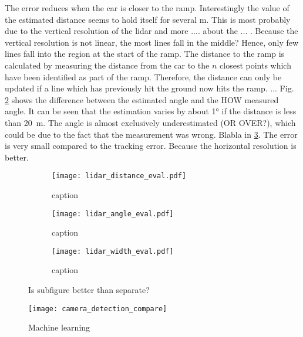 The error reduces when the car is closer to the ramp.
Interestingly the value of the estimated distance seems to hold itself for several m.
This is most probably due to the vertical resolution of the \gls{lidar} and more .... about the ... .
Because the vertical resolution is not linear, the most lines fall in the middle?
Hence, only few lines fall into the region at the start of the ramp.
The distance to the ramp is calculated by measuring the distance from the car to the $n$ closest points which have been identified as part of the ramp.
Therefore, the distance can only be updated if a line which has previously hit the ground now hits the ramp.
...
Fig. \ref{fig:lidar_angle_eval} shows the difference between the estimated angle and the HOW measured angle.
It can be seen that the estimation varies by about \ang{1} if the distance is less than \SI{20}{\metre}.
The angle is almost exclusively underestimated (OR OVER?), which could be due to the fact that the measurement was wrong.
Blabla in \ref{fig:lidar_width_eval}.
The error is very small compared to the tracking error.
Because the horizontal resolution is better.
\begin{figure}[htb]
	\centering
	\begin{subfigure}{1\textwidth}
		\centering
		\texttt{[image: lidar\_distance\_eval.pdf]}
		\caption{caption}
		\label{fig:lidar_distance_eval}
	\end{subfigure}
	
	\begin{subfigure}{1\textwidth}
		\centering
		\texttt{[image: lidar\_angle\_eval.pdf]}
		\caption{caption}
		\label{fig:lidar_angle_eval}
	\end{subfigure}
	
	\begin{subfigure}{1\textwidth}
		\centering
		\texttt{[image: lidar\_width\_eval.pdf]}
		\caption{caption}
		\label{fig:lidar_width_eval}
	\end{subfigure}
	\caption{Is subfigure better than separate?}
	\label{fig:lidar_eval}
\end{figure}

\begin{figure}[htbp]
	\centering
	\texttt{[image: camera\_detection\_compare]}
	\caption{Machine learning}
	\label{fig:camera_detection_compare}
\end{figure}